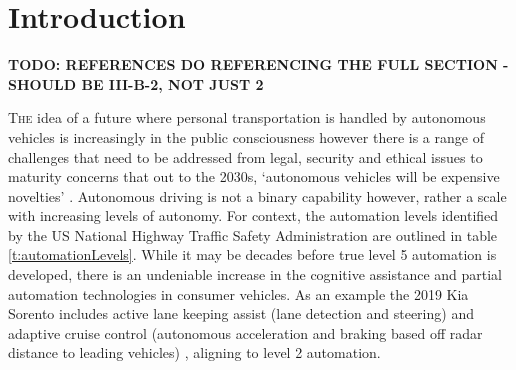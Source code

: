 \documentclass[]{aiaa-tc}%
\begin{document}
\newpage
\section{Introduction} \label{sect:intro}
 \textbf{TODO: REFERENCES DO REFERENCING THE FULL SECTION - SHOULD BE III-B-2, NOT JUST 2}
 
\lettrine[nindent=0pt]{T}{he} idea of a future where personal transportation is handled by autonomous vehicles is increasingly in the public consciousness however there is a range of challenges that need to be addressed from legal, security and ethical issues \citep{gmReport} to maturity concerns that out to the 2030s, `autonomous vehicles will be expensive novelties' \citep{vicTransportImplications}. Autonomous driving is not a binary capability however, rather a scale with increasing levels of autonomy. For context, the automation levels identified by the US National Highway Traffic Safety Administration \citep{automationVisionForSafety} are outlined in table \ref{t:automationLevels}. While it may be decades before true level 5 automation is developed, there is an undeniable increase in the cognitive assistance and partial automation technologies in consumer vehicles. As an example the 2019 Kia Sorento includes active lane keeping assist (lane detection and steering) and adaptive cruise control (autonomous acceleration and braking based off radar distance to leading vehicles) \citep{kia}, aligning to level 2 automation. 
\end{document}
